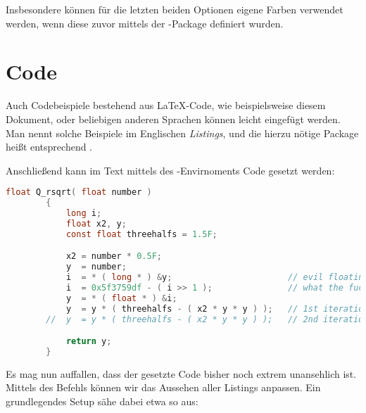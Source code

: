 Insbesondere können für die letzten beiden Optionen eigene Farben verwendet werden, wenn diese zuvor mittels der -Package definiert wurden.
\begin{latexlisting}
	\usepackage{xcolor}
\end{latexlisting}

\section{Code}
Auch Codebeispiele bestehend aus \LaTeX{}-Code, wie beispielsweise diesem Dokument, oder beliebigen anderen Sprachen können leicht eingefügt werden.
Man nennt solche Beispiele im Englischen \emph{Listings}, und die hierzu nötige Package heißt entsprechend .
\begin{latexlisting}
	\usepackage{listings}
\end{latexlisting}
Anschließend kann im Text mittels des -Envirnoments Code gesetzt werden:
\begin{latexlisting}
	\begin{lstlisting}[language=C]
		float Q_rsqrt( float number )
		{
			long i;
			float x2, y;
			const float threehalfs = 1.5F;

			x2 = number * 0.5F;
			y  = number;
			i  = * ( long * ) &y;                       // evil floating point bit level hacking
			i  = 0x5f3759df - ( i >> 1 );               // what the fuck?
			y  = * ( float * ) &i;
			y  = y * ( threehalfs - ( x2 * y * y ) );   // 1st iteration
		//	y  = y * ( threehalfs - ( x2 * y * y ) );   // 2nd iteration, this can be removed

			return y;
		}
	\end{lstlisting}
\end{latexlisting}
Es mag nun auffallen, dass der gesetzte Code bisher noch extrem unansehlich ist.
Mittels des Befehls  können wir das Aussehen aller Listings anpassen.
Ein grundlegendes Setup sähe dabei etwa so aus:
\begin{latexlisting}
	\lstset{
	    basicstyle=\ttfamily\footnotesize,
		columns=fullflexible,
	    breakatwhitespace=false,         
	    breaklines=true,                 
	    keepspaces=true,                 
	    numbers=none,       
	    numbersep=5pt,                  
	    showspaces=false,                
	    showstringspaces=false,
	    showtabs=false,                  
	    tabsize=4,
	}
\end{latexlisting}
